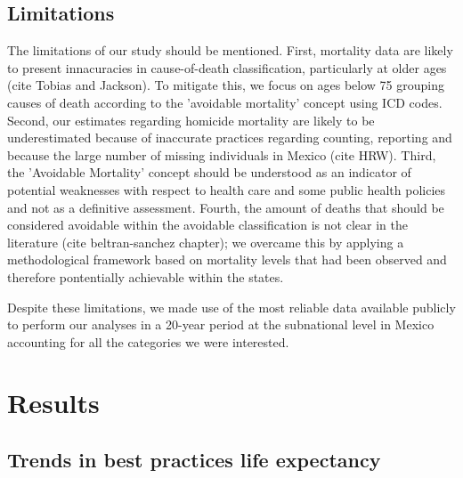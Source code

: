 \documentclass{article}
\begin{document}
\subsection*{Limitations}
The limitations of our study should be mentioned. First, mortality data are likely to present innacuracies in cause-of-death classification, particularly at older ages (cite Tobias and Jackson). To mitigate this, we focus on ages below 75 grouping causes of death according to the 'avoidable mortality' concept using ICD codes. Second, our estimates regarding homicide mortality are likely to be underestimated because of inaccurate practices regarding counting, reporting and because the large number of missing individuals in Mexico (cite HRW). Third, the 'Avoidable Mortality' concept should be understood as an indicator of potential weaknesses with respect to health care and some public health policies and not as a definitive assessment. Fourth, the amount of deaths that should be considered avoidable within the avoidable classification is not clear in the literature (cite beltran-sanchez chapter); we overcame this by applying a methodological framework based on mortality levels that had been observed and therefore pontentially achievable within the states.

Despite these limitations, we made use of the most reliable data available publicly to perform our analyses in a 20-year period at the subnational level in Mexico accounting for all the categories we were interested.



\section*{Results}
\subsection{Trends in best practices life expectancy}
\end{document}

